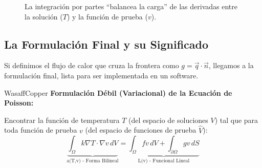 \documentclass[11pt, a4paper]{article}
\begin{document}
\begin{figure}[h!]
\centering
{}
\caption{La integración por partes ``balancea la carga'' de las derivadas entre la solución ($T$) y la función de prueba ($v$).}
\label{fig:weakening}
\end{figure}

\subsection{La Formulación Final y su Significado}
Si definimos el flujo de calor que cruza la frontera como $g = \vec{q} \cdot \vec{n}$, llegamos a la formulación final, lista para ser implementada en un software.

\begin{keybox}{WasaffCopper}
    \textbf{Formulación Débil (Variacional) de la Ecuación de Poisson:}
    
    Encontrar la función de temperatura $T$ (del espacio de soluciones $V$) tal que para toda función de prueba $v$ (del espacio de funciones de prueba $\hat{V}$):
    \begin{equation}
        \boxed{
        \underbrace{\int_{\Omega} k \nabla T \cdot \nabla v \, dV}_{\text{a(T,v) - Forma Bilineal}} = \underbrace{\int_{\Omega} f v \, dV + \int_{\partial \Omega} g v \, dS}_{\text{L(v) - Funcional Lineal}}
        }
    \end{equation}
\end{keybox}
\end{document}
